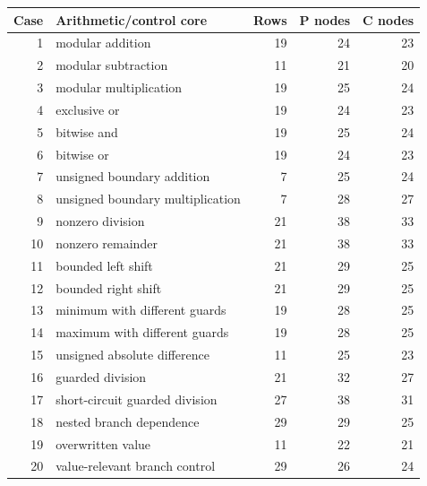 \begin{tabular}{r l r r r}
\toprule
Case & Arithmetic/control core & Rows & P nodes & C nodes \\
\midrule
1 & modular addition & 19 & 24 & 23 \\
2 & modular subtraction & 11 & 21 & 20 \\
3 & modular multiplication & 19 & 25 & 24 \\
4 & exclusive or & 19 & 24 & 23 \\
5 & bitwise and & 19 & 25 & 24 \\
6 & bitwise or & 19 & 24 & 23 \\
7 & unsigned boundary addition & 7 & 25 & 24 \\
8 & unsigned boundary multiplication & 7 & 28 & 27 \\
9 & nonzero division & 21 & 38 & 33 \\
10 & nonzero remainder & 21 & 38 & 33 \\
11 & bounded left shift & 21 & 29 & 25 \\
12 & bounded right shift & 21 & 29 & 25 \\
13 & minimum with different guards & 19 & 28 & 25 \\
14 & maximum with different guards & 19 & 28 & 25 \\
15 & unsigned absolute difference & 11 & 25 & 23 \\
16 & guarded division & 21 & 32 & 27 \\
17 & short-circuit guarded division & 27 & 38 & 31 \\
18 & nested branch dependence & 29 & 29 & 25 \\
19 & overwritten value & 11 & 22 & 21 \\
20 & value-relevant branch control & 29 & 26 & 24 \\
\bottomrule
\end{tabular}
